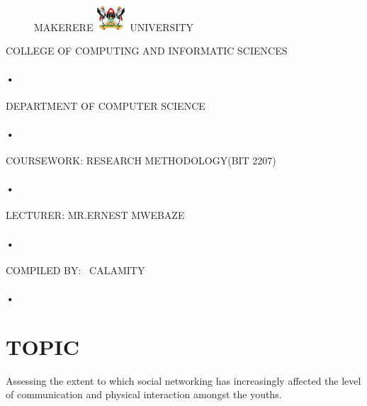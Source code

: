 \documentclass[11pt,A4paper]{article}
\begin{document}
\begin{titlepage}
  \begin{figure}[h]
  \centerline{\small MAKERERE 
  \includegraphics[width=0.1\textwidth]{muk_log} UNIVERSITY}
\end{figure}
\centerline{COLLEGE OF COMPUTING AND INFORMATIC SCIENCES}
\paragraph{•}
\centerline{DEPARTMENT OF COMPUTER SCIENCE\\}
\paragraph{•}

\centerline{COURSEWORK: RESEARCH METHODOLOGY(BIT 2207)\\}
\paragraph{•}

\centerline{LECTURER: MR.ERNEST MWEBAZE}

\paragraph{•}
\centerline{COMPILED BY: \
 CALAMITY}
\paragraph{•}
\end{titlepage}
\tableofcontents
\newpage
{}
\section{TOPIC}
Assessing the extent to which social networking has increasingly affected the level of communication and physical interaction amongst the youths.
\end{document}
